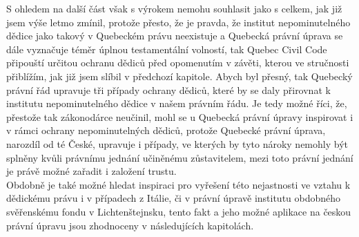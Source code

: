 \documentclass{article}
\begin{document}
S ohledem na další část však s výrokem nemohu souhlasit jako s celkem, jak již jsem výše letmo zmínil, protože přesto, že je pravda, že institut nepominutelného dědice jako takový v Quebeckém právu neexistuje a Quebecká právní úprava se dále vyznačuje téměr úplnou testamentální volností, tak Quebec Civil Code připouští určitou ochranu dědiců před opomenutím v závěti, kterou ve stručnosti přiblížím, jak již jsem slíbil v předchozí kapitole. Abych byl přesný, tak Quebecký právní řád upravuje tři případy ochrany dědiců, které by se daly přirovnat k institutu nepominutelného dědice v našem právním řádu. Je tedy možné říci, že, přestože tak zákonodárce neučinil, mohl se u Quebecká právní úpravy inspirovat i v rámci ochrany nepominutelných dědiců, protože Quebecké právní úprava, narozdíl od té České, upravuje i případy, ve kterých by tyto nároky nemohly být splněny kvůli právnímu jednání učiněnému zůstavitelem, mezi toto právní jednání je právě možné zařadit i založení trustu. \\

Obdobně je také možné hledat inspiraci pro vyřešení této nejastnosti ve vztahu k dědickému právu i v případech z Itálie, či v právní úpravě institutu obdobného svěřenskému fondu v Lichtenštejnsku, tento fakt a jeho možné aplikace na českou právní úpravu jsou zhodnoceny v následujících kapitolách. \\



\end{document}
